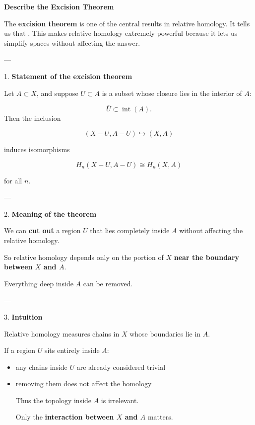 \documentclass[12pt,a4paper]{report}
\begin{document}
\begin{description}
\newpage
\item \textbf{Describe the Excision Theorem}

The \textbf{excision theorem} is one of the central results in relative homology. It tells us that . This makes relative homology extremely powerful because it lets us simplify spaces without affecting the answer.

---

\begin{description}
\item 1. \textbf{Statement of the excision theorem}

Let $A \subset X$, and suppose $U \subset A$ is a subset whose closure lies in the interior of $A$:

$$ \overline{U} \subset \operatorname{int}(A).  $$ Then the inclusion

$$ (X-U, A-U) \hookrightarrow (X,A) $$

induces isomorphisms

$$ H_n(X-U, A-U) \cong H_n(X,A) $$

for all $n$.

---

\item 2. \textbf{Meaning of the theorem}

We can \textbf{cut out} a region $U$ that lies completely inside $A$ without affecting the relative homology.

So relative homology depends only on the portion of $X$ \textbf{near the boundary between $X$ and $A$}.

Everything deep inside $A$ can be removed.

---

\item 3. \textbf{Intuition}

Relative homology measures chains in $X$ whose boundaries lie in $A$.

If a region $U$ sits entirely inside $A$:

\begin{itemize}

\item  any chains inside $U$ are already considered trivial
\item  removing them does not affect the homology

Thus the topology inside $A$ is irrelevant.

Only the \textbf{interaction between $X$ and $A$} matters.


\end{itemize}
\end{description}
\end{description}
\end{document}
